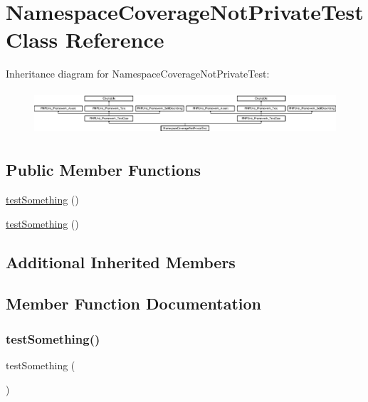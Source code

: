 \hypertarget{class_namespace_coverage_not_private_test}{}\section{Namespace\+Coverage\+Not\+Private\+Test Class Reference}
\label{class_namespace_coverage_not_private_test}
Inheritance diagram for Namespace\+Coverage\+Not\+Private\+Test\+:\begin{figure}[H]
\begin{center}
\leavevmode
\includegraphics[height=1.651917cm]{class_namespace_coverage_not_private_test}
\end{center}
\end{figure}
\subsection*{Public Member Functions}
\begin{DoxyCompactItemize}
\item 
\mbox{\hyperlink{class_namespace_coverage_not_private_test_a0fc4e17369bc9607ebdd850d9eda8167}{test\+Something}} ()
\item 
\mbox{\hyperlink{class_namespace_coverage_not_private_test_a0fc4e17369bc9607ebdd850d9eda8167}{test\+Something}} ()
\end{DoxyCompactItemize}
\subsection*{Additional Inherited Members}


\subsection{Member Function Documentation}
\mbox{\label{class_namespace_coverage_not_private_test_a0fc4e17369bc9607ebdd850d9eda8167}} 
\subsubsection{\texorpdfstring{test\+Something()}{testSomething()}\hspace{0.1cm}{\footnotesize\ttfamily [1/2]}}
{\footnotesize\ttfamily test\+Something (\begin{DoxyParamCaption}{ }\end{DoxyParamCaption})}

